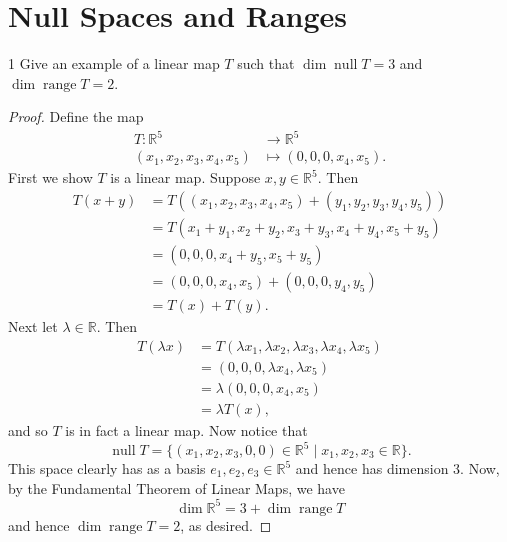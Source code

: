 \documentclass{extarticle}
\newenvironment{problem}[1]{\begin{prob*}{#1}{}}{\end{prob*}}
\newcommand{\R}{\mathbb{R}}
\DeclareMathOperator{\Null}{null}
\DeclareMathOperator{\Range}{range}
\begin{document}
\section{Null Spaces and Ranges}

\begin{problem}{1}
Give an example of a linear map $T$ such that $\dim\Null T = 3$ and $\dim\Range T = 2$.
\end{problem}
\begin{proof}
Define the map
\begin{align*}
T:\R^5 &\to \R^5\\
  (x_1, x_2, x_3,x_4, x_5) &\mapsto (0, 0, 0, x_4, x_5).
\end{align*}
First we show $T$ is a linear map.  Suppose $x,y\in\R^5$.  Then
\begin{align*}
T(x + y) &= T((x_1, x_2, x_3,x_4, x_5) + (y_1, y_2, y_3,y_4, y_5) )\\
&= T(x_1+y_1, x_2+y_2, x_3+y_3,x_4+y_4, x_5+y_5)\\
&= (0, 0, 0, x_4 + y_5, x_5 + y_5)\\
&= (0, 0, 0, x_4, x_5) + (0, 0, 0, y_4, y_5)\\
&= T(x) + T(y).
\end{align*}
Next let $\lambda\in\R$.  Then
\begin{align*}
T(\lambda x) &= T(\lambda x_1, \lambda x_2, \lambda x_3, \lambda x_4, \lambda x_5) \\
&= (0, 0, 0, \lambda x_4, \lambda x_5)\\
&= \lambda(0,0,0,x_4, x_5)\\
&= \lambda T(x),
\end{align*}
and so $T$ is in fact a linear map.  Now notice that
\begin{equation*}
\Null T = \{(x_1,x_2,x_3,0,0)\in\R^5\mid x_1, x_2, x_3\in\R\}.
\end{equation*}  
This space clearly has as a basis $e_1,e_2,e_3\in\R^5$ and hence has dimension $3$.  Now, by the Fundamental Theorem of Linear Maps, we have 
\begin{equation*}
\dim\R^5 = 3 + \dim\Range T
\end{equation*}
and hence $\dim\Range T = 2$, as desired.
\end{proof}
\end{document}
